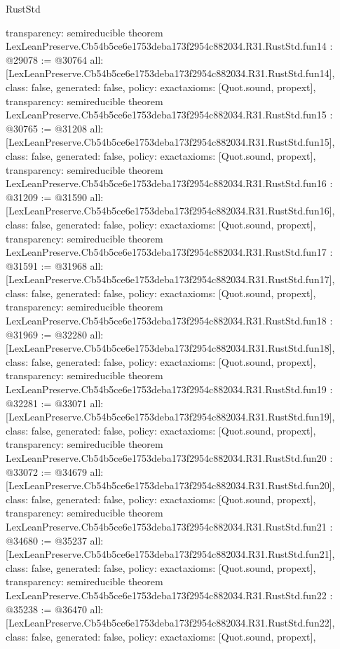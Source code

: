 \begin{lexlean}{RustStd}
\begin{coremodule}
{  transparency: semireducible
}
theorem LexLeanPreserve.Cb54b5ce6e1753deba173f2954c882034.R31.RustStd.fun14 : @29078 := @30764 {
  all: [LexLeanPreserve.Cb54b5ce6e1753deba173f2954c882034.R31.RustStd.fun14],
  class: false,
  generated: false,
  policy: exact{axioms: [Quot.sound, propext]},
  transparency: semireducible
}
theorem LexLeanPreserve.Cb54b5ce6e1753deba173f2954c882034.R31.RustStd.fun15 : @30765 := @31208 {
  all: [LexLeanPreserve.Cb54b5ce6e1753deba173f2954c882034.R31.RustStd.fun15],
  class: false,
  generated: false,
  policy: exact{axioms: [Quot.sound, propext]},
  transparency: semireducible
}
theorem LexLeanPreserve.Cb54b5ce6e1753deba173f2954c882034.R31.RustStd.fun16 : @31209 := @31590 {
  all: [LexLeanPreserve.Cb54b5ce6e1753deba173f2954c882034.R31.RustStd.fun16],
  class: false,
  generated: false,
  policy: exact{axioms: [Quot.sound, propext]},
  transparency: semireducible
}
theorem LexLeanPreserve.Cb54b5ce6e1753deba173f2954c882034.R31.RustStd.fun17 : @31591 := @31968 {
  all: [LexLeanPreserve.Cb54b5ce6e1753deba173f2954c882034.R31.RustStd.fun17],
  class: false,
  generated: false,
  policy: exact{axioms: [Quot.sound, propext]},
  transparency: semireducible
}
theorem LexLeanPreserve.Cb54b5ce6e1753deba173f2954c882034.R31.RustStd.fun18 : @31969 := @32280 {
  all: [LexLeanPreserve.Cb54b5ce6e1753deba173f2954c882034.R31.RustStd.fun18],
  class: false,
  generated: false,
  policy: exact{axioms: [Quot.sound, propext]},
  transparency: semireducible
}
theorem LexLeanPreserve.Cb54b5ce6e1753deba173f2954c882034.R31.RustStd.fun19 : @32281 := @33071 {
  all: [LexLeanPreserve.Cb54b5ce6e1753deba173f2954c882034.R31.RustStd.fun19],
  class: false,
  generated: false,
  policy: exact{axioms: [Quot.sound, propext]},
  transparency: semireducible
}
theorem LexLeanPreserve.Cb54b5ce6e1753deba173f2954c882034.R31.RustStd.fun20 : @33072 := @34679 {
  all: [LexLeanPreserve.Cb54b5ce6e1753deba173f2954c882034.R31.RustStd.fun20],
  class: false,
  generated: false,
  policy: exact{axioms: [Quot.sound, propext]},
  transparency: semireducible
}
theorem LexLeanPreserve.Cb54b5ce6e1753deba173f2954c882034.R31.RustStd.fun21 : @34680 := @35237 {
  all: [LexLeanPreserve.Cb54b5ce6e1753deba173f2954c882034.R31.RustStd.fun21],
  class: false,
  generated: false,
  policy: exact{axioms: [Quot.sound, propext]},
  transparency: semireducible
}
theorem LexLeanPreserve.Cb54b5ce6e1753deba173f2954c882034.R31.RustStd.fun22 : @35238 := @36470 {
  all: [LexLeanPreserve.Cb54b5ce6e1753deba173f2954c882034.R31.RustStd.fun22],
  class: false,
  generated: false,
  policy: exact{axioms: [Quot.sound, propext]},
}
\end{coremodule}
\end{lexlean}
